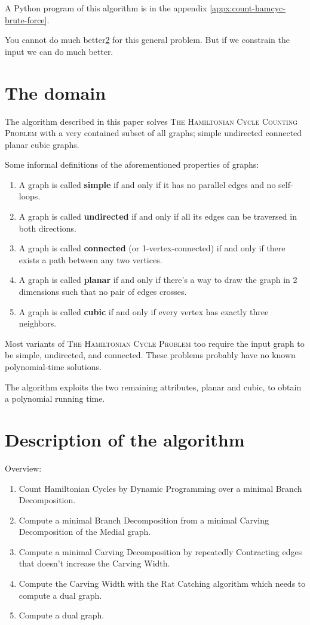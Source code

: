 \documentclass{article}
\begin{document}
	A Python program of this algorithm is in the appendix \ref{appx:count-hamcyc-brute-force}.

	You cannot do much better\ref{} for this general problem. But if we constrain the input we can do much better.

\section{The domain}
	The algorithm described in this paper solves \textsc{The Hamiltonian Cycle Counting Problem} with a very contained subset of all graphs; simple undirected connected planar cubic graphs.

	Some informal definitions of the aforementioned properties of graphs:

	\begin{enumerate}
		\item A graph is called \textbf{simple} if and only if it has no parallel edges and no self-loops.
		\item A graph is called \textbf{undirected} if and only if all its edges can be traversed in both directions.
		\item A graph is called \textbf{connected} (or 1-vertex-connected) if and only if there exists a path between any two vertices.
		\item A graph is called \textbf{planar} if and only if there's a way to draw the graph in 2 dimensions such that no pair of edges crosses.
		\item A graph is called \textbf{cubic} if and only if every vertex has exactly three neighbors.
	\end{enumerate}

	Most variants of \textsc{The Hamiltonian Cycle Problem} too require the input graph to be simple, undirected, and connected. These problems probably have no known polynomial-time solutions.

	The algorithm exploits the two remaining attributes, planar and cubic, to obtain a polynomial running time.

\section{Description of the algorithm}

	Overview:

	\begin{enumerate}
		\item Count Hamiltonian Cycles by Dynamic Programming over a minimal Branch Decomposition.
		\item Compute a minimal Branch Decomposition from a minimal Carving Decomposition of the Medial graph.
		\item Compute a minimal Carving Decomposition by repeatedly Contracting edges that doesn't increase the Carving Width.
		\item Compute the Carving Width with the Rat Catching algorithm which needs to compute a dual graph.
		\item Compute a dual graph.
	\end{enumerate}
\end{document}
